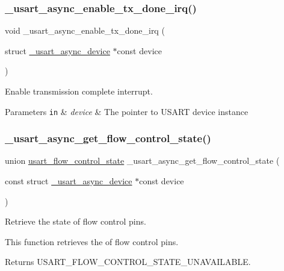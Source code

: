 \subsubsection{\texorpdfstring{\+\_\+usart\+\_\+async\+\_\+enable\+\_\+tx\+\_\+done\+\_\+irq()}{\_usart\_async\_enable\_tx\_done\_irq()}}
{\footnotesize\ttfamily void \+\_\+usart\+\_\+async\+\_\+enable\+\_\+tx\+\_\+done\+\_\+irq (\begin{DoxyParamCaption}\item[{struct \hyperlink{struct__usart__async__device}{\+\_\+usart\+\_\+async\+\_\+device} $\ast$const}]{device }\end{DoxyParamCaption})}



Enable transmission complete interrupt. 


\begin{DoxyParams}[1]{Parameters}
\mbox{\tt in}  & {\em device} & The pointer to U\+S\+A\+RT device instance \\
\hline
\end{DoxyParams}
\mbox{\label{group___h_p_l_gaa9850f9d97cb87f80fa615e95330ce35}} 
\subsubsection{\texorpdfstring{\+\_\+usart\+\_\+async\+\_\+get\+\_\+flow\+\_\+control\+\_\+state()}{\_usart\_async\_get\_flow\_control\_state()}}
{\footnotesize\ttfamily union \hyperlink{unionusart__flow__control__state}{usart\+\_\+flow\+\_\+control\+\_\+state} \+\_\+usart\+\_\+async\+\_\+get\+\_\+flow\+\_\+control\+\_\+state (\begin{DoxyParamCaption}\item[{const struct \hyperlink{struct__usart__async__device}{\+\_\+usart\+\_\+async\+\_\+device} $\ast$const}]{device }\end{DoxyParamCaption})}



Retrieve the state of flow control pins. 

This function retrieves the of flow control pins.

\begin{DoxyReturn}{Returns}
U\+S\+A\+R\+T\+\_\+\+F\+L\+O\+W\+\_\+\+C\+O\+N\+T\+R\+O\+L\+\_\+\+S\+T\+A\+T\+E\+\_\+\+U\+N\+A\+V\+A\+I\+L\+A\+B\+LE. 
\end{DoxyReturn}
\mbox{\label{group___h_p_l_ga378f2b4e0a90e5f5e354da00b3e6e531}} 
